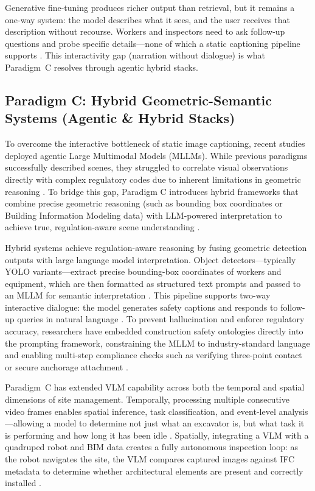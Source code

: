 \documentclass[10pt,letterpaper]{article}
\begin{document}
Generative fine-tuning produces richer output than retrieval, but it remains a one-way system: the model describes what it sees, and the user receives that description without recourse. Workers and inspectors need to ask follow-up questions and probe specific details---none of which a static captioning pipeline supports \cite{chen2024}. This interactivity gap (narration without dialogue) is what Paradigm~C resolves through agentic hybrid stacks.

\subsection{Paradigm C: Hybrid Geometric-Semantic Systems (Agentic \& Hybrid Stacks)}

To overcome the interactive bottleneck of static image captioning, recent studies deployed agentic Large Multimodal Models (MLLMs). While previous paradigms successfully described scenes, they struggled to correlate visual observations directly with complex regulatory codes due to inherent limitations in geometric reasoning \cite{hussain2026}. To bridge this gap, Paradigm C introduces hybrid frameworks that combine precise geometric reasoning (such as bounding box coordinates or Building Information Modeling data) with LLM-powered interpretation to achieve true, regulation-aware scene understanding \cite{hussain2026}.

Hybrid systems achieve regulation-aware reasoning by fusing geometric detection outputs with large language model interpretation. Object detectors---typically YOLO variants---extract precise bounding-box coordinates of workers and equipment, which are then formatted as structured text prompts and passed to an MLLM for semantic interpretation \cite{hussain2026}. This pipeline supports two-way interactive dialogue: the model generates safety captions and responds to follow-up queries in natural language \cite{hussain2026}. To prevent hallucination and enforce regulatory accuracy, researchers have embedded construction safety ontologies directly into the prompting framework, constraining the MLLM to industry-standard language and enabling multi-step compliance checks such as verifying three-point contact or secure anchorage attachment \cite{chan2025}.

Paradigm~C has extended VLM capability across both the temporal and spatial dimensions of site management. Temporally, processing multiple consecutive video frames enables spatial inference, task classification, and event-level analysis---allowing a model to determine not just what an excavator is, but what task it is performing and how long it has been idle \cite{jeoung2025}. Spatially, integrating a VLM with a quadruped robot and BIM data creates a fully autonomous inspection loop: as the robot navigates the site, the VLM compares captured images against IFC metadata to determine whether architectural elements are present and correctly installed \cite{tuomisto2026}.
\end{document}
